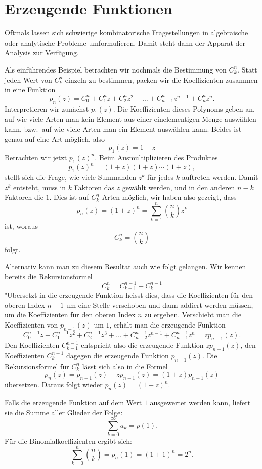 \section{Erzeugende Funktionen}
Oftmals lassen sich schwierige kombinatorische Fragestellungen in
algebraische oder analytische Probleme umformulieren.
Damit steht
dann der Apparat der Analysis zur Verfügung.

Als einführendes
Beispiel betrachten wir nochmals die Bestimmung von $C^n_k$.
Statt jeden Wert von $C^n_k$ einzeln zu bestimmen, packen wir
die Koeffizienten zusammen in eine Funktion
\[
p_n(z)=C^n_0+C^n_1z +C^n_2z^2+\dots+C^n_{n-1}z^{n-1}+C^n_nz^n.
\]
Interpretieren wir zunächst $p_1(z)$.
Die Koeffizienten dieses
Polynoms geben an, auf wie viele Arten man kein Element aus einer
einelementigen Menge auswählen kann, bzw.~auf wie viele Arten man 
ein Element auswählen kann.
Beides ist genau auf eine Art möglich,
also
\[
p_1(z)=1+z
\]
Betrachten wir jetzt $p_1(z)^n$.
Beim Ausmultiplizieren des
Produktes 
\[
p_1(z)^n= (1+z)(1+z)\dotsm(1+z),
\]
stellt sich die Frage, wie viele Summanden $z^k$ für jedes
$k$ auftreten werden.
Damit $z^k$ entsteht, muss in $k$ Faktoren das $z$ gewählt werden,
und in den anderen $n-k$ Faktoren die $1$.
Dies ist auf $C^n_k$
Arten möglich, wir haben also gezeigt, dass
\[
p_n(z)=(1+z)^n=\sum_{k=1}^n \binom{n}{k}z^k
\]
ist, woraus
\[
C^n_k=\binom{n}{k}
\]
folgt.

Alternativ kann man zu diesem Resultat auch wie folgt gelangen.
Wir kennen bereits die Rekursionsformel
\[
C^n_k=C^{n-1}_{k-1}+C^{n-1}_k
\]
"Ubersetzt in die erzeugende Funktion heisst dies, dass die Koeffizienten
für den oberen Index $n-1$
um eine Stelle verschoben und dann addiert werden müssen,
um die Koeffizienten für den oberen Index $n$ zu ergeben.
Verschiebt
man die Koeffizienten von $p_{n-1}(z)$ um $1$,
erhält man die erzeugende Funktion
\[
C^{n-1}_0z
+C^{n-1}_1z^2
+C^{n-1}_2z^3
+\dots
+C^{n-1}_{n-2}z^{n-1}
+C^{n-1}_{n-1}z^n
=
zp_{n-1}(z).
\]
Den Koeffizienten $C^{n-1}_{k-1}$ entspricht also die
erzeugende Funktion $zp_{n-1}(z)$,
den Koeffizienten $C^{n-1}_k$ dagegen die erzeugende Funktion $p_{n-1}(z)$.
Die Rekursionsformel für $C^n_k$ lässt sich also in die Formel
\[
p_n(z)=p_{n-1}(z)+zp_{n-1}(z)=(1+z)p_{n-1}(z)
\]
übersetzen.
Daraus folgt wieder $p_n(z)=(1+z)^n$.

Falls die erzeugende Funktion auf dem Wert $1$ ausgewertet werden kann,
liefert sie die Summe aller Glieder der Folge:
\[
\sum_{k=0}^\infty a_k=p(1).
\]
Für die Binomialkoeffizienten ergibt sich:
\[
\sum_{k=0}^n\binom{n}{k}=p_n(1)=(1+1)^n=2^n.
\]

